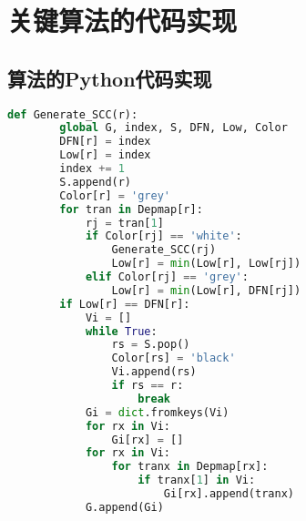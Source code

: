 \chapter{关键算法的代码实现}

\section{算法的Python代码实现}

\begin{lstlisting}[language={Python}]
    def Generate_SCC(r):
        global G, index, S, DFN, Low, Color
        DFN[r] = index
        Low[r] = index
        index += 1
        S.append(r)
        Color[r] = 'grey'
        for tran in Depmap[r]:
            rj = tran[1]
            if Color[rj] == 'white':
                Generate_SCC(rj)
                Low[r] = min(Low[r], Low[rj])
            elif Color[rj] == 'grey':
                Low[r] = min(Low[r], DFN[rj])
        if Low[r] == DFN[r]:
            Vi = []
            while True:
                rs = S.pop()
                Color[rs] = 'black'
                Vi.append(rs)
                if rs == r:
                    break
            Gi = dict.fromkeys(Vi)
            for rx in Vi:
                Gi[rx] = []
            for rx in Vi:
                for tranx in Depmap[rx]:
                    if tranx[1] in Vi:
                        Gi[rx].append(tranx)
            G.append(Gi)   
\end{lstlisting}
